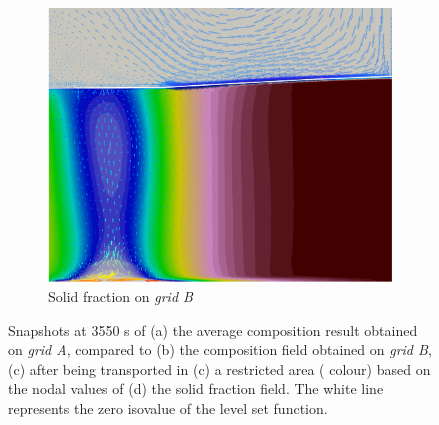 \begin{figure}[htbp]
\begin{subfigure}[t]{0.4\textwidth}
  \includegraphics[width=\textwidth]{Chapter5/Graphics/2d/processed/1700s_gs_vl.png}
  \caption{Solid fraction on \emph{grid B}}
    \label{fig:1700s_gs}
  \end{subfigure}
\caption{Snapshots at 3550 s of (a) the average composition result obtained on \emph{grid A}, compared to (b) the composition field obtained on \emph{grid B}, 
(c) after being transported in (c) a restricted area ( colour) based on the nodal values of (d) the solid fraction field.
The white line represents the zero isovalue of the level set function.}
\label{fig:W_mask_1700s}
\end{figure}


